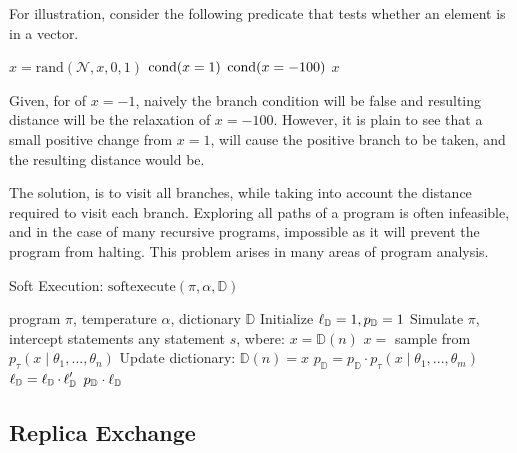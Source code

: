 For illustration, consider the following predicate that tests whether an element is in a vector.

\begin{exprogram}[tb]
\caption{}
\label{prog:ex1}
\begin{algorithmic}
\STATE $x = \textrm{rand}(\mathcal{N}, x, 0, 1)$
\STATE $\operatorname{cond}(x = 1)$
\ELSE
\STATE $\operatorname{cond}(x = -100)$
\ENDIF
{} $x$
\end{algorithmic}
\end{exprogram}

Given, for of $x = -1$, naively the branch condition will be false and resulting distance will be the relaxation of $x = -100$.
However, it is plain to see that a small positive change from $x = 1$, will cause the positive branch to be taken, and the resulting distance would be.

The solution, is to visit all branches, while taking into account the distance required to visit each branch.
Exploring all paths of a program is often infeasible, and in the case of many recursive programs, impossible as it will prevent the program from halting.
This problem arises in many areas of program analysis.


\begin{algorithm}[tb]
  \caption{Soft Execution: $\textrm{softexecute}(\pi, \alpha, \mathbb{D})$}
  \label{alg:softexecute}
\begin{algorithmic}
 program $\pi$, temperature $\alpha$, dictionary $\mathbb{D}$
\STATE Initialize $\operatorname{\ell}_\mathbb{D} = 1, p_\mathbb{D} = 1$
\STATE Simulate $\pi$, intercept statements any statement $s$, wbere:   
   \STATE $x = \mathbb{D}(n)$
 \ELSE
   \STATE $x = $ sample from $p_\tau(x \mid \theta_1, ..., \theta_n)$
   \STATE Update dictionary: $\mathbb{D}(n) = x$
 \ENDIF
 \STATE $p_\mathbb{D} = p_\mathbb{D} \cdot p_\tau(x \mid \theta_1, ..., \theta_m)$
   \STATE $\operatorname{\ell}_\mathbb{D} = \operatorname{\ell}_\mathbb{D} \cdot \operatorname{\ell}_\mathbb{D}'$
 \ENDIF
{} $p_\mathbb{D} \cdot \operatorname{\ell}_\mathbb{D}$
\end{algorithmic}
\end{algorithm}

\subsection{Replica Exchange}

